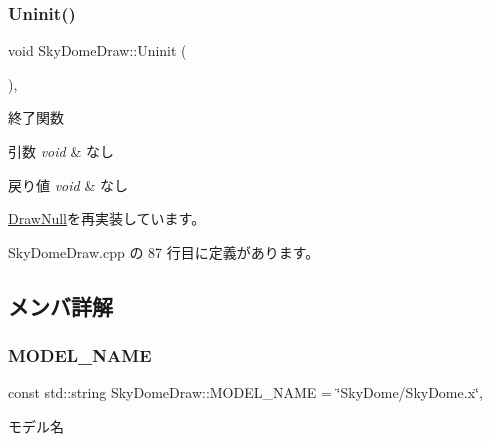 \subsubsection{\texorpdfstring{Uninit()}{Uninit()}}
{\footnotesize\ttfamily void Sky\+Dome\+Draw\+::\+Uninit (\begin{DoxyParamCaption}{ }\end{DoxyParamCaption})\hspace{0.3cm}{\ttfamily [override]}, {\ttfamily [virtual]}}



終了関数 


\begin{DoxyParams}{引数}
{\em void} & なし \\
\hline
\end{DoxyParams}

\begin{DoxyRetVals}{戻り値}
{\em void} & なし \\
\hline
\end{DoxyRetVals}


\mbox{\hyperlink{class_draw_null_a6e81d63efab7333e8d0e8af99362a4d9}{Draw\+Null}}を再実装しています。



 Sky\+Dome\+Draw.\+cpp の 87 行目に定義があります。



\subsection{メンバ詳解}
\mbox{\label{class_sky_dome_draw_a366fd9d1040d77ddac71e335f10f2c29}} 
\subsubsection{\texorpdfstring{M\+O\+D\+E\+L\+\_\+\+N\+A\+ME}{MODEL\_NAME}}
{\footnotesize\ttfamily const std\+::string Sky\+Dome\+Draw\+::\+M\+O\+D\+E\+L\+\_\+\+N\+A\+ME = \char`\"{}Sky\+Dome/Sky\+Dome.\+x\char`\"{}\hspace{0.3cm}{\ttfamily [static]}, {\ttfamily [private]}}



モデル名 



